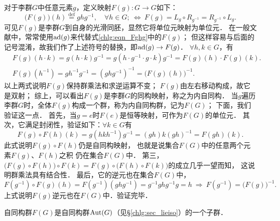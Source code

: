 对于李群$G$中任意元素$g$，定义映射$F(g):G\to G$如下：
\begin{equation}\label{chlg:eqn_Fghg}
    \bigl(F(g)\bigr) (h) \overset{\mathrm {def}}{=} g h g^{-1},\quad \forall h\in G;
    \ \Leftrightarrow \
    F(g) = L_g \circ R_{g^{-1}} = R_{g^{-1}}\circ L_g .
\end{equation}
可见$F(g)$是李群$G$到自身的光滑同胚，显然它将单位元映射为单位元．
在一般文献中，常常使用${\rm ad}(g)$来代替式\eqref{chlg:eqn_Fghg}中的$F(g)$；
但这样容易与后面的记号混淆，故我们作了上述符号的替换，即${\rm ad}(g) \to F(g)$．
$\forall h,k\in G$，有
\begin{align}
    &F(g) (h\cdot k) = g(h\cdot k)g^{-1}=g(h\cdot g^{-1} \cdot g\cdot k)g^{-1}
    =F(g) (h) \cdot F(g) (k) . \\
    &F(g)(h^{-1}) = gh^{-1}g^{-1} = (ghg^{-1})^{-1} = \bigl(F(g) (h)\bigr)^{-1} .
\end{align}
以上两式说明$F(g)$保持群乘法和求逆运算不变；
$F(g)$由左右移动构成，故它是双射；
综上，可以看出$F(g)$是李群$G$的同构映射，称之为{\heiti 内自同构}．
当$g$遍历李群$G$时，全体$F(g)$构成一个群，称为{\heiti 内自同构群}，记为$F(G)$；
下面，我们验证这一点．
首先，当$g=e$时$F(e)$是恒等映射，可作为$F(G)$的单位元．
其次，它满足封闭性，验证如下：$\forall k\in G$有
\begin{equation}\label{chlg:eqn_tmpffkk}
    F(g)\circ F(h) (k) = g(hkh^{-1})g^{-1}
    =(gh) k (gh)^{-1} = F(gh)(k) .
\end{equation}
此式说明$F(g)\circ F(h)$仍是自同构映射，
也就是说集合$F(G)$中的任意两个元素$F(g)$、$ F(h)$之积
仍在集合$F(G)$中．
第三，$\bigl(F(g)\circ F(h)\bigr)\circ F(k)
=F(g)\circ\bigl( F(h)\circ F(k)\bigr)$的成立几乎一望而知，
这说明群乘法具有结合性．
最后，它的逆元也在集合$F(G)$中，
\begin{equation*}
    F(g^{-1})\circ F(g) (h)=F(g^{-1})(g h g^{-1} ) = g^{-1} g h g^{-1} g = h
    \ \Rightarrow \  F(g^{-1}) = \bigl( F(g)\bigr)^{-1} .
\end{equation*}
上式说明$F(g)$逆元也在$F(G)$中．验证完毕．

自同构群$F(G)$是自同构群${\rm Aut}(G)$（见\S\ref{chlg:sec_lieiso}）的一个子群．

